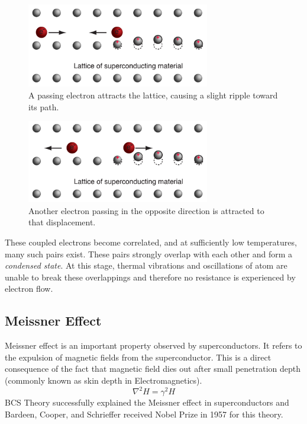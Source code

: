 \documentclass{article}
\begin{document}
	\begin{figure}[h]
		\centering
		\includegraphics[width=8cm]{bcs7.png}
		\caption{A passing electron attracts the lattice, causing a slight ripple toward its path.}
	\end{figure}
	
	\begin{figure}[h]
		\centering
		\includegraphics[width=8cm]{bcs8.png}
		\caption{Another electron passing in the opposite direction is attracted to that displacement.}
	\end{figure}
	
	These coupled electrons become correlated, and at sufficiently low temperatures, many such pairs exist. These pairs strongly overlap with each other and form a \textit{condensed state}. At this stage, thermal vibrations and oscillations of atom are unable to break these overlappings and therefore no resistance is experienced by electron flow. 
	
	
	\subsection{Meissner Effect}
	Meissner effect is an important property observed by superconductors. It refers to the expulsion of magnetic fields from the superconductor. This is a direct consequence of the fact that magnetic field dies out after small penetration depth (commonly known as skin depth in Electromagnetics).
	$$
	\nabla^2 H = \gamma^2 H
	$$
	BCS Theory successfully explained the Meissner effect in superconductors and Bardeen, Cooper, and Schrieffer received Nobel Prize in 1957 for this theory. 
	
\end{document}
